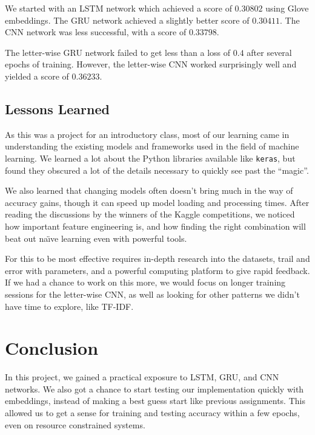 \documentclass{article}
\begin{document}
We started with an LSTM network which achieved a score of $0.30802$ using Glove embeddings. The GRU network achieved a slightly better score of $0.30411$. The CNN network was less successful, with a score of $0.33798$.

The letter-wise GRU network failed to get less than a loss of $0.4$ after several epochs of training. However, the letter-wise CNN worked surprisingly well and yielded a score of $0.36233$.

\subsection{Lessons Learned}

As this was a project for an introductory class, most of our learning came in understanding the existing models and frameworks used in the field of machine learning. We learned a lot about the Python libraries available like \texttt{keras}, but found they obscured a lot of the details necessary to quickly see past the ``magic''.

We also learned that changing models often doesn't bring much in the way of accuracy gains, though it can speed up model loading and processing times. After reading the discussions by the winners of the Kaggle competitions, we noticed how important feature engineering is, and how finding the right combination will beat out na\"{\i}ve learning even with powerful tools.

For this to be most effective requires in-depth research into the datasets, trail and error with parameters, and a powerful computing platform to give rapid feedback. If we had a chance to work on this more, we would focus on longer training sessions for the letter-wise CNN, as well as looking for other patterns we didn't have time to explore, like TF-IDF.


\section{Conclusion}

In this project, we gained a practical exposure to LSTM, GRU, and CNN networks. We also got a chance to start testing our implementation quickly with embeddings, instead of making a best guess start like previous assignments. This allowed us to get a sense for training and testing accuracy within a few epochs, even on resource constrained systems.
\end{document}
